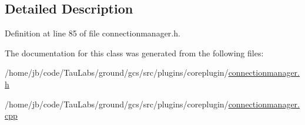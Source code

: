 \subsection{\-Detailed \-Description}


\-Definition at line 85 of file connectionmanager.\-h.



\-The documentation for this class was generated from the following files\-:\begin{DoxyCompactItemize}
\item 
/home/jb/code/\-Tau\-Labs/ground/gcs/src/plugins/coreplugin/\hyperlink{connectionmanager_8h}{connectionmanager.\-h}\item 
/home/jb/code/\-Tau\-Labs/ground/gcs/src/plugins/coreplugin/\hyperlink{connectionmanager_8cpp}{connectionmanager.\-cpp}\end{DoxyCompactItemize}
